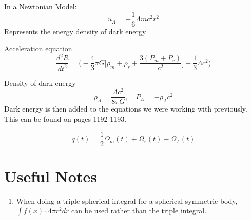 In a Newtonian Model:
\begin{equation}
	\label{}
	u_{\Lambda}=-\frac{1}{6}\Lambda m c^{2}r^{2}
\end{equation}
Represents the energy density of dark energy


Acceleration equation
\begin{equation}
	\label{}
	\frac{d^{2}R}{dt^{2}}=\bigg(-\frac{4}{3}\pi G \big[\rho_{m}+\rho_{r}+\frac{3(P_{m}+P_{r})}{c^{2}}\big]+\frac{1}{3}\Lambda c^{2}\bigg)
\end{equation}

Density of dark energy
\begin{equation}
	\label{}
	\rho_{\Lambda}=\frac{\Lambda c^{2}}{8\pi G},\quad P_{\Lambda}=-\rho_{\Lambda}c^{2}
\end{equation}
Dark energy is then added to the equations we were working with previously. This can be found on pages 1192-1193.

\begin{equation}
	\label{}
q(t)=\frac{1}{2}\Omega_{m}(t)+\Omega_{r}(t)-\Omega_{\Lambda}(t)
\end{equation}


\pagebreak
\section{Useful Notes}
\begin{enumerate}
	\item When doing a triple spherical integral for a spherical symmetric body, $\int f(x) \cdot 4\pi r^{2}dr$ can be used rather than the triple integral.	
\end{enumerate}



